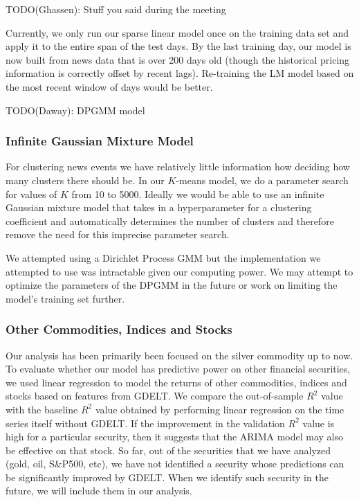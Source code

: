 
TODO(Ghassen): Stuff you said during the meeting

Currently, we only run our sparse linear model once on the training data set and apply it to the entire span of the test days. By the last training day, our model is now built from news data that is over 200 days old (though the historical pricing information is correctly offset by recent lags). Re-training the LM model based on the most recent window of days would be better.

TODO(Daway): DPGMM model
\subsubsection{Infinite Gaussian Mixture Model}
For clustering news events we have relatively little information how deciding how many clusters there should be. In our $K$-means model, we do a parameter search for values of $K$ from 10 to 5000. Ideally we would be able to use an infinite Gaussian mixture model that takes in a hyperparameter for a clustering coefficient and automatically determines the number of clusters and therefore remove the need for this imprecise parameter search. 

We attempted using a Dirichlet Process GMM but the implementation we attempted to use was intractable given our computing power. We may attempt to optimize the parameters of the DPGMM in the future or work on limiting the model's training set further. 

\subsubsection{Other Commodities, Indices and Stocks}
Our analysis has been primarily been focused on the silver commodity up to now. To evaluate whether our model has predictive power on other financial securities, we used linear regression to model the returns of other commodities, indices and stocks based on features from GDELT. We compare the out-of-sample $R^2$ value with the baseline $R^2$ value obtained by performing linear regression on the time series itself without GDELT. If the improvement in the validation $R^2$ value is high for a particular security, then it suggests that the ARIMA model may also be effective on that stock. So far, out of the securities that we have analyzed (gold, oil, S\&P500, etc), we have not identified a security whose predictions can be significantly improved by GDELT. When we identify such security in the future, we will include them in our analysis.

